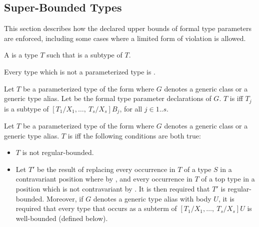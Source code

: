 \documentclass[makeidx]{article}
\begin{document}
\subsection{Super-Bounded Types}

\LMHash{}%
This section describes how
the declared upper bounds of formal type parameters are enforced,
including some cases where a limited form of violation is allowed.

\LMHash{}%
A  is a type $T$ such that  is a subtype of $T$.


\LMHash{}%
Every type which is not a parameterized type is
.

\LMHash{}%
Let $T$ be a parameterized type of the form
where $G$ denotes a generic class or a generic type alias.
Let \TypeParametersStd{}
be the formal type parameter declarations of $G$.
$T$ is  if{}f
$T_j$ is a subtype of
$[T_1/X_1, \ldots,\ T_s/X_s]B_j$,
for all $j \in 1 .. s$.


\LMHash{}%
%
Let $T$ be a parameterized type of the form 
where $G$ denotes a generic class or a generic type alias.
$T$ is  if{}f the following conditions are both true:

\begin{itemize}
\item
  $T$ is not regular-bounded.
\item
  Let $T'$ be the result of replacing every occurrence in $T$ of
  a type $S$ in a contravariant position where 
  by ,
  and every occurrence in $T$ of a top type in
  a position which is not contravariant
  by .
  It is then required that $T'$ is regular-bounded.
  Moreover, if $G$ denotes a generic type alias with body $U$,
  it is required that every type that occurs as a subterm of
  $[T_1/X_1, \ldots,\ T_s/X_s]U$
  is well-bounded (defined below).
\end{itemize}
\end{document}
